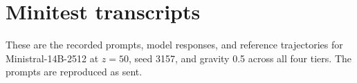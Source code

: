 \documentclass{article}
\begin{document}
\section{Minitest transcripts}
These are the recorded prompts, model responses, and reference trajectories for
Ministral-14B-2512 at $z=50$, seed 3157, and gravity 0.5 across all four tiers.
The prompts are reproduced as sent.
\end{document}

